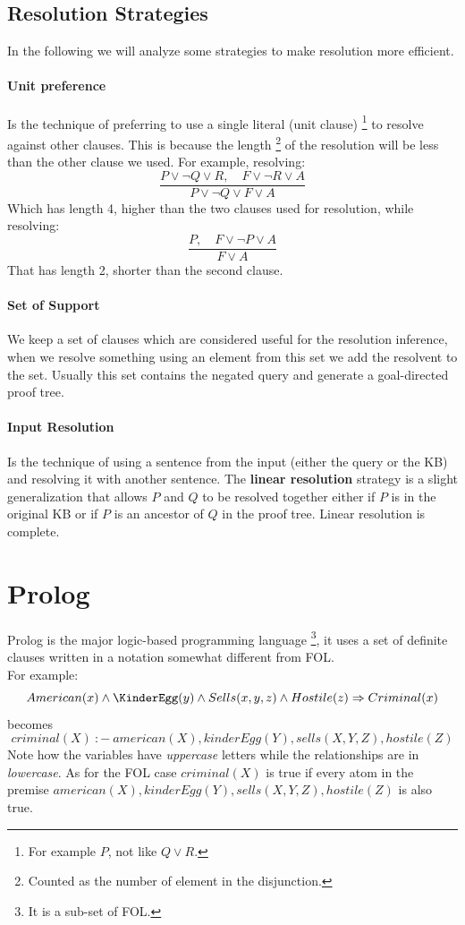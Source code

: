 \documentclass[10pt,a4paper]{article}
\begin{document}
\subsection{Resolution Strategies}
In the following we will analyze some strategies to make resolution more efficient.

\paragraph{Unit preference} Is the technique of preferring to use a single literal (unit clause) \footnote{For example $P$, not like $Q\vee R$.} to resolve against other clauses. This is because the length \footnote{Counted as the number of element in the disjunction.} of the resolution will be less than the other clause we used. For example, resolving:
\[\frac{P\vee \neg Q \vee R,\quad  F \vee \neg R \vee A}{P\vee \neg Q\vee F \vee A}\]
Which has length 4, higher than the two clauses used for resolution, while resolving:
\[\frac{P,\quad  F \vee \neg P \vee A}{ F \vee A}\]
That has length 2, shorter than the second clause.

\paragraph{Set of Support} We keep a set of clauses which are considered useful for the resolution inference, when we resolve something using an element from this set we add the resolvent to the set. Usually this set contains the negated query and generate a goal-directed proof tree.


\paragraph{Input Resolution} Is the technique of using a sentence from the input (either the query or the KB) and resolving it with another sentence. The \textbf{linear resolution} strategy is a slight generalization that allows $P$ and $Q$ to be resolved together either if $P$ is in the original KB or if $P$ is an ancestor of $Q$ in the proof tree. Linear resolution is complete.











\newpage


\section{Prolog}
Prolog is the major logic-based programming language \footnote{It is a sub-set of FOL.}, it uses a set of definite clauses written in a notation somewhat different from FOL.\\ 
For example:
\[American(x)\wedge \KinderEgg(y)\wedge Sells(x,y,z)\wedge Hostile(z)\Rightarrow Criminal(x)\]
becomes
\[criminal(X)\ :-\ american(X), kinderEgg(Y), sells(X,Y,Z), hostile(Z)\]
Note how the variables have \textit{uppercase} letters while the relationships are in \textit{lowercase}. As for the FOL case $criminal(X)$ is true if every atom in the premise $american(X), kinderEgg(Y), sells(X,Y,Z), hostile(Z)$ is also true.\\
\end{document}
